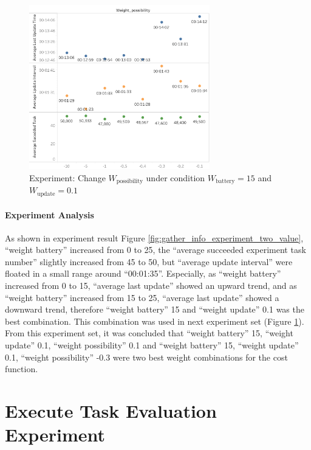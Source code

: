 \begin{figure}[htbp]
    \centering
    \includegraphics[width = 0.7\textwidth]{content/images/ch5/gather_info_change_weight_possibility_only.png}
    \caption{Experiment: Change $W_{\mbox{possibility}}$ under condition $W_{\mbox{battery}}=15$ and $ W_{\mbox{update}}=0.1$}
    \label{fig:gather_info_experiment_three_value}
\end{figure}

\paragraph{Experiment Analysis} 
As shown in experiment result Figure \ref{fig:gather_info_experiment_two_value}, ``weight battery'' increased from 0 to 25, the ``average succeeded experiment task number'' slightly increased from 45 to 50, but ``average update interval'' were floated in a small range around ``00:01:35''. Especially, as ``weight battery'' increased from 0 to 15, ``average last update'' showed an upward trend, and as ``weight battery'' increased from 15 to 25, ``average last update'' showed a downward trend, 
therefore ``weight battery'' 15 and ``weight update'' 0.1 was the best combination. 
This combination was used in next experiment set (Figure \ref{fig:gather_info_experiment_three_value}). From this experiment set, it was concluded that ``weight battery'' 15, ``weight update'' 0.1, ``weight possibility'' 0.1 and ``weight battery'' 15, ``weight update'' 0.1, ``weight possibility'' -0.3 were two best weight combinations for the cost function.

\section{Execute Task Evaluation Experiment}
\label{sec:execute_task_experiments}
